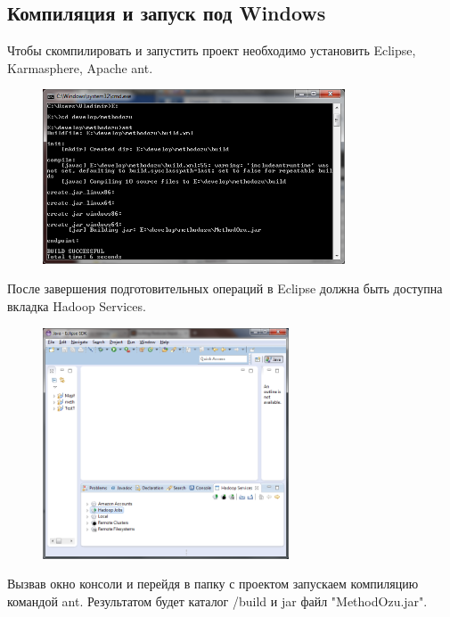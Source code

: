 \documentclass[12pt,a4paper]{extarticle} %
\begin{document}
\newpage
\subsection{Компиляция и запуск под Windows}
    Чтобы скомпилировать и запустить проект необходимо установить Eclipse, Karmasphere, Apache ant.
\begin{figure}[h]
    \centering
    \includegraphics[width=0.8\textwidth]{images/windows-compile.png}
\end{figure}

    После завершения подготовительных операций в Eclipse должна быть доступна вкладка Hadoop Services.
\begin{figure}[h]
    \centering
    \includegraphics[width=0.65\textwidth]{images/eclipse-hadoop-services.png}
\end{figure}

\clearpage\newpage
    Вызвав окно консоли и перейдя в папку с проектом запускаем компиляцию командой ant. Результатом будет каталог /build и jar файл "MethodOzu.jar".
\end{document}
